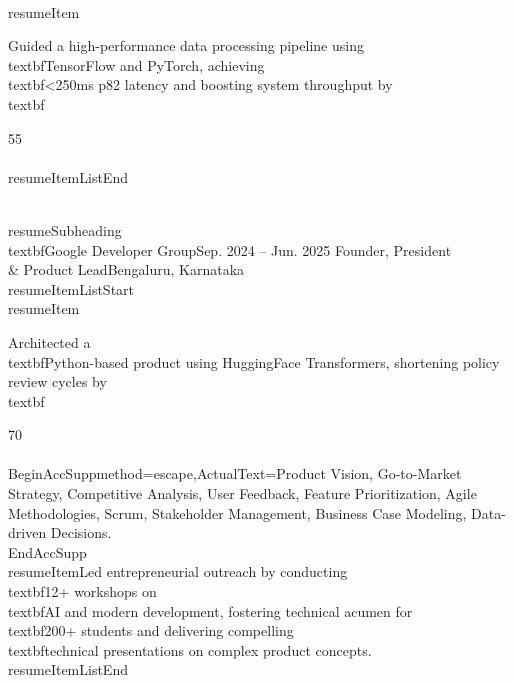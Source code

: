 \documentclass[a4paper]{extarticle}
\makeatletter
\renewcommand\normalsize{\fontsize{10}{11.8}\selectfont}
\newcommand{\resumeItem}[1]{
  \item\normalsize{
    {#1 \vspace{-2pt}}
  }
}
\newcommand{\resumeSubheading}[4]{
  \vspace{-2pt}\item
    \begin{tabular*}{1.0\textwidth}[t]{l@{\extracolsep{\fill}}r}
      \textbf{#1} & \textbf{\small #2} \
      \textit{\small#3} & \textit{\small #4} \
    \end{tabular*}\vspace{-7pt}
}
\newcommand{\resumeItemListStart}{\begin{itemize}}
\newcommand{\resumeItemListEnd}{\end{itemize}\vspace{-5pt}}
\makeatother
\begin{document}
        \\resumeItem{Guided a high-performance data processing pipeline using \\textbf{TensorFlow} and PyTorch, achieving \\textbf{<250ms p82} latency and boosting system throughput by \\textbf{55\\%
    \\resumeItemListEnd
    
    \\resumeSubheading
    {\\textbf{Google Developer Group}}{Sep. 2024 -- Jun. 2025}
    {Founder, President \\& Product Lead}{Bengaluru, Karnataka}
    \\resumeItemListStart
        \\resumeItem{Architected a \\textbf{Python}-based product using HuggingFace Transformers, shortening policy review cycles by \\textbf{70\\%
        \\BeginAccSupp{method=escape,ActualText={Product Vision, Go-to-Market Strategy, Competitive Analysis, User Feedback, Feature Prioritization, Agile Methodologies, Scrum, Stakeholder Management, Business Case Modeling, Data-driven Decisions.}}\hspace{0pt}\\EndAccSupp{}
        \\resumeItem{Led entrepreneurial outreach by conducting \\textbf{12+} workshops on \\textbf{AI} and modern development, fostering technical acumen for \\textbf{200+} students and delivering compelling \\textbf{technical presentations} on complex product concepts.}
    \\resumeItemListEnd

}}}}
\end{document}
